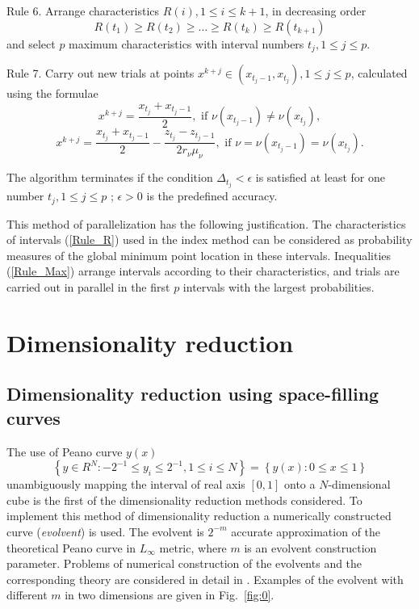 \documentclass[a4paper]{jpconf}
\begin{document}
Rule 6. Arrange characteristics  $R(i), 1 \leq i \leq k+1$, in decreasing order 
\begin{equation}\label{Rule_Max}
R(t_1)\geq R(t_2)\geq \dots \geq R(t_{k}) \geq R(t_{k+1})
\end{equation}
and select $p$ maximum characteristics with interval numbers $t_j, 1\leq j \leq p$.

Rule 7. Carry out new trials at points $x^{k+j}\in(x_{t_j-1},x_{t_j}), 1\leq j\leq p$, calculated using the formulae
\[
x^{k+j} = \frac{x_{t_j} + x_{t_j-1}}{2}, \textrm{ if } \nu(x_{t{_j}-1}) \neq \nu(x_{t_j}),
\]
\begin{equation}\label{Rule_X}
x^{k+j} = \frac{x_{t_j}+x_{t_j-1}}{2} - \frac{z_{t_j}-z_{t_j-1}}{2r_\nu \mu_\nu}, \textrm{ if } \nu=\nu(x_{t_j-1})=\nu(x_{t_j}).
\end{equation}

The algorithm terminates if the condition $\Delta_{t_j}<\epsilon$ is satisfied at least for one number $t_j, 1 \leq j \leq p$ ; $\epsilon>0$ is the predefined accuracy.

This method of parallelization has the following justification. The characteristics of intervals (\ref{Rule_R}) used in the index method can be considered as probability measures of the global minimum point location in these intervals. Inequalities (\ref{Rule_Max}) arrange intervals according to their characteristics, and trials are carried out in parallel in the first $p$ intervals with the largest probabilities.

\section{Dimensionality reduction}

\subsection{Dimensionality reduction using space-filling curves}

The use of Peano curve $y(x)$ 
\[
\left\{y\in R^N: -2^{-1}\leq y_i \leq 2^{-1}, 1 \leq i \leq 
N\right\}=\left\{y(x):0\leq x \leq 1 \right\}
\]
unambiguously mapping the interval of real axis $[0,1]$ onto a $N$-dimensional cube is the first of the dimensionality reduction methods considered.  To implement this method of dimensionality reduction a 
numerically constructed curve (\textit{evolvent}) is used. The evolvent is 
$2^{-m}$ accurate approximation of the theoretical Peano curve in $L_\infty$ 
metric, where $m$ is an evolvent construction parameter. Problems of 
numerical construction of the evolvents and the corresponding theory are 
considered in detail in \cite{Strongin2000}. Examples of the evolvent with different $m$ in two dimensions are given in Fig.~\ref{fig:0}.
\end{document}
